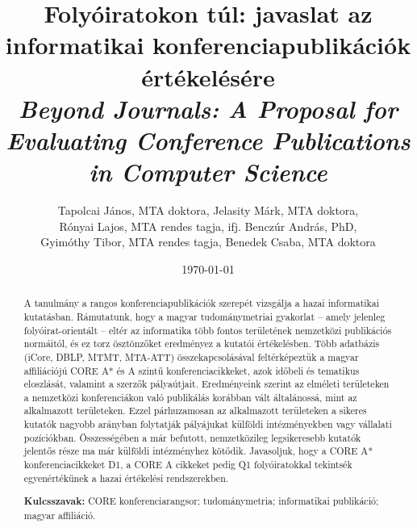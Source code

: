 \documentclass[12pt,a4paper]{article}
\title{Folyóiratokon túl: javaslat az informatikai konferenciapublikációk értékelésére\\[0.5em]
\emph{
Beyond Journals: A Proposal for Evaluating Conference Publications in Computer Science
}}
\author{Tapolcai János, MTA doktora, 
 Jelasity Márk, MTA doktora, \\
 Rónyai Lajos, MTA rendes tagja, 
 ifj. Benczúr András, PhD, \\
 Gyimóthy Tibor, MTA rendes tagja,
 Benedek Csaba, MTA doktora 
 }
\date{\today}
\begin{document}
\maketitle


\begin{abstract}
A tanulmány a rangos konferenciapublikációk szerepét vizsgálja a hazai informatikai kutatásban. Rámutatunk, hogy a magyar tudománymetriai gyakorlat – amely jelenleg folyóirat-orientált – eltér az informatika több fontos területének nemzetközi publikációs normáitól, és ez torz ösztönzőket eredményez a kutatói értékelésben. Több adatbázis (iCore, DBLP, MTMT, MTA-ATT) összekapcsolásával feltérképeztük a magyar affiliációjú CORE A\!* és A szintű konferenciacikkeket, azok időbeli és tematikus eloszlását, valamint a szerzők pályaútjait. Eredményeink szerint az elméleti területeken a nemzetközi konferenciákon való publikálás korábban vált általánossá, mint az alkalmazott területeken. Ezzel párhuzamosan az alkalmazott területeken a sikeres kutatók nagyobb arányban folytatják pályájukat külföldi intézményekben vagy vállalati pozíciókban. Összességében a már befutott, nemzetközileg legsikeresebb kutatók jelentős része ma már külföldi intézményhez kötődik.  Javasoljuk, hogy a CORE A\!* konferenciacikkeket D1, a CORE A cikkeket pedig Q1 folyóiratokkal tekintsék egyenértékűnek a hazai értékelési rendszerekben.
\par\medskip
\textbf{Kulcsszavak:} CORE konferenciarangsor; tudománymetria; informatikai publikáció; magyar affiliáció.
\end{abstract}
\end{document}
